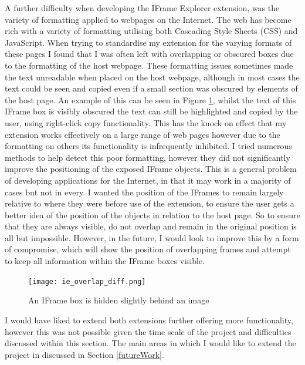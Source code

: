 \documentclass[12pt]{article}
\begin{document}
A further difficulty when developing the IFrame Explorer extension, was the variety of formatting applied to webpages on the Internet. The web has become rich with a variety of formatting utilising both Cascading Style Sheets (CSS) and JavaScript. When trying to standardise my extension for the varying formats of these pages I found that I was often left with overlapping or obscured boxes due to the formatting of the host webpage. These formatting issues sometimes made the text unreadable when placed on the host webpage, although in most cases the text could be seen and copied even if a small section was obscured by elements of the host page. An example of this can be seen in Figure \ref{fig:ie_overlap_diff}, whilst the text of this IFrame box is visibly obscured the text can still be highlighted and copied by the user, using right-click copy functionality. This has the knock on effect that my extension works effectively on a large range of web pages however due to the formatting on others its functionality is infrequently inhibited. I tried numerous methods to help detect this poor formatting, however they did not significantly improve the positioning of the exposed IFrame objects. This is a general problem of developing applications for the Internet, in that it may work in a majority of cases but not in every. I wanted the position of the IFrames to remain largely relative to where they were before use of the extension, to ensure the user gets a better idea of the position of the objects in relation to the host page. So to ensure that they are always visible, do not overlap and remain in the original position is all but impossible. However,  in the future, I would look to improve this by a form of compromise, which will show the position of overlapping frames and attempt to keep all information within the IFrame boxes visible. \\

\begin{figure}[H]
    \centering
    \texttt{[image: ie\_overlap\_diff.png]}
    \caption{An IFrame box is hidden slightly behind an image}
    \label{fig:ie_overlap_diff}
\end{figure}

I would have liked to extend both extensions further offering more functionality, however this was not possible given the time scale of the project and difficulties discussed within this section. The main areas in which I would like to extend the project in discussed in Section \ref{futureWork}.
\end{document}
